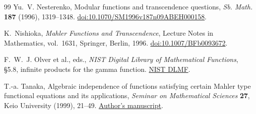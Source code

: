 \documentclass[11pt,a4paper]{article}
\theoremstyle{definition}
\theoremstyle{remark}
\numberwithin{equation}{section}
\begin{document}
\begin{thebibliography}{99}
 Yu.~V. Nesterenko, Modular functions and transcendence questions, \emph{Sb. Math.} \textbf{187} (1996), 1319--1348. \href{https://doi.org/10.1070/SM1996v187n09ABEH000158}{doi:10.1070/SM1996v187n09ABEH000158}.

K.~Nishioka, \emph{Mahler Functions and Transcendence}, Lecture Notes in
Mathematics, vol.~1631, Springer, Berlin, 1996.
\href{https://doi.org/10.1007/BFb0093672}{doi:10.1007/BFb0093672}.

 F.~W.~J. Olver et al., eds., \emph{NIST Digital Library of Mathematical Functions}, \S5.8, infinite products for the gamma function. \href{https://dlmf.nist.gov/5.8}{NIST DLMF}.

 T.-a. Tanaka, Algebraic independence of functions satisfying certain Mahler type functional equations and its applications, \textit{Seminar on Mathematical Sciences} \textbf{27}, Keio University (1999), 21--49. \href{https://www.math.keio.ac.jp/~takaaki/papers/FranJTanaka(manuscript).pdf}{Author's manuscript}.
\end{thebibliography}
\end{document}
